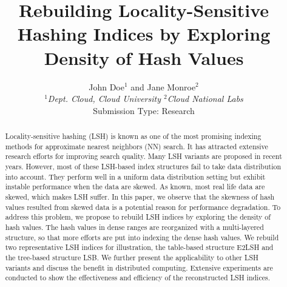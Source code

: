 \documentclass{vldb}
\begin{document}
\newcommand{\Paragraph}[1]{\smallskip{\bf #1.}}
\newcommand{\Paragraphnopunc}[1]{\smallskip\noindent{\bf #1}}
\newcommand{\Paragraphwithindent}[1]{\smallskip{\bf #1.}}
\newcommand{\tabincell}[2]{\begin{tabular}{@{}#1@{}}#2\end{tabular}}
\newcommand{\argmin}{\text{arg}\,\text{min}}
\newcommand{\argmax}{\text{arg}\,\text{max}}

\theoremstyle{definition}
\newtheorem{definition}{Definition}


\title{Rebuilding Locality-Sensitive Hashing Indices by Exploring Density of Hash Values}
\author{John Doe$^1$ and Jane Monroe$^2$ \\
\small {\em  $^1$Dept. Cloud, Cloud University \quad
          $^2$Cloud National Labs} \\ [2mm]
\small Submission Type: Research
}
\date{}
\maketitle

\begin{abstract}
Locality-sensitive hashing (LSH) is known as one of the most promising indexing methods for approximate nearest neighbors (NN) search. It has attracted extensive research efforts for improving search quality. Many LSH variants are proposed in recent years. However, most of these LSH-based index structures fail to take data distribution into account. They perform well in a uniform data distribution setting but exhibit instable performance when the data are skewed. As known, most real life data are skewed, which makes LSH suffer. In this paper, we observe that the skewness of hash values resulted from skewed data is a potential reason for performance degradation. To address this problem, we propose to rebuild LSH indices by exploring the density of hash values. The hash values in dense ranges are reorganized with a multi-layered structure, so that more efforts are put into indexing the dense hash values. We rebuild two representative LSH indices for illustration, the table-based structure E2LSH and the tree-based structure LSB. We further present the applicability to other LSH variants and discuss the benefit in distributed computing. Extensive experiments are conducted to show the effectiveness and efficiency of the reconstructed LSH indices.
\end{abstract}

















\end{document}
